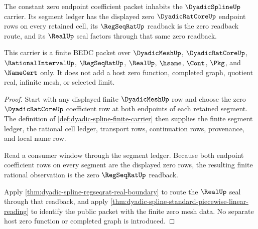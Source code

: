 \begin{theorem}
\label{thm:dyadic-spline-zero-segment-carrier}
The constant zero endpoint coefficient packet inhabits the $\DyadicSplineUp$ carrier. Its segment ledger has the displayed zero $\DyadicRatCoreUp$ endpoint rows on every retained cell, its $\RegSeqRatUp$ readback is the zero readback route, and its $\RealUp$ seal factors through that same zero readback.

This carrier is a finite BEDC packet over $\DyadicMeshUp$, $\DyadicRatCoreUp$, $\RationalIntervalUp$, $\RegSeqRatUp$, $\RealUp$, $\hsame$, $\Cont$, $\Pkg$, and $\NameCert$ only. It does not add a host zero function, completed graph, quotient real, infinite mesh, or selected limit.
\end{theorem}
\begin{proof}
Start with any displayed finite $\DyadicMeshUp$ row and choose the zero $\DyadicRatCoreUp$ coefficient row at both endpoints of each retained segment. The definition of \autoref{def:dyadic-spline-finite-carrier} then supplies the finite segment ledger, the rational cell ledger, transport rows, continuation rows, provenance, and local name row.

Read a consumer window through the segment ledger. Because both endpoint coefficient rows on every segment are the displayed zero rows, the resulting finite rational observation is the zero $\RegSeqRatUp$ readback.

Apply \autoref{thm:dyadic-spline-regseqrat-real-boundary} to route the $\RealUp$ seal through that readback, and apply \autoref{thm:dyadic-spline-standard-piecewise-linear-reading} to identify the public packet with the finite zero mesh data. No separate host zero function or completed graph is introduced.
\end{proof}

